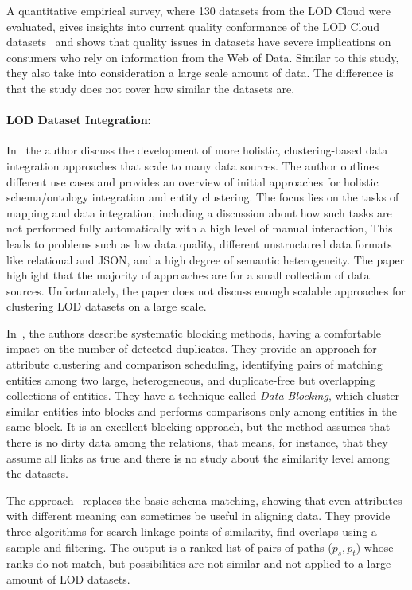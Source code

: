 \documentclass[sw]{iosart2x}
\begin{document}
A quantitative empirical survey, where 130 datasets from the LOD Cloud were evaluated, gives insights into current quality conformance of the LOD Cloud datasets~\cite{debattista2018evaluating} and shows that quality issues in datasets have severe implications on consumers who rely on information from the Web
of Data.
Similar to this study, they also take into consideration a large scale amount of data.
The difference is that the study does not cover how similar the datasets are.

\paragraph*{\textbf{LOD Dataset Integration:}}
In~\cite{rahm2016case} the author discuss the development of more holistic, clustering-based data integration approaches that scale to many data sources.
The author outlines different use cases and provides an overview of initial approaches for holistic schema/ontology integration and entity clustering.
The focus lies on the tasks of mapping and data integration, including a discussion about how such tasks are not performed fully automatically with a high level of manual interaction,
This leads to problems such as low data quality, different unstructured data formats like relational and JSON, and a high degree of semantic heterogeneity.
The paper highlight that the majority of approaches are for a small collection of data sources.
Unfortunately, the paper does not discuss enough scalable approaches for clustering LOD datasets on a large scale.

In~\cite{papadakis2012blocking}, the authors describe systematic blocking methods, having a comfortable impact on the number of detected duplicates.
They provide an approach for attribute clustering and comparison scheduling, identifying pairs of matching entities among two large, heterogeneous, and duplicate-free but overlapping collections of entities.
They have a technique called \emph{Data Blocking}, which cluster similar entities into blocks and performs comparisons only among entities in the same block.
It is an excellent blocking approach, but the method assumes that there is no dirty data among the relations, that means, for instance, that they assume all  links as true and there is no study about the similarity level among the datasets.
 
The approach~\cite{hassanzadeh2013discovering} replaces the basic schema matching, showing that even attributes with different meaning can sometimes be useful in aligning data.
They provide three algorithms for search linkage points of similarity, find overlaps using a sample and filtering.
The output is a ranked list of pairs of paths ($p_s, p_t$) whose ranks do not match, but possibilities are not similar and not applied to a large amount of LOD datasets.
\end{document}
